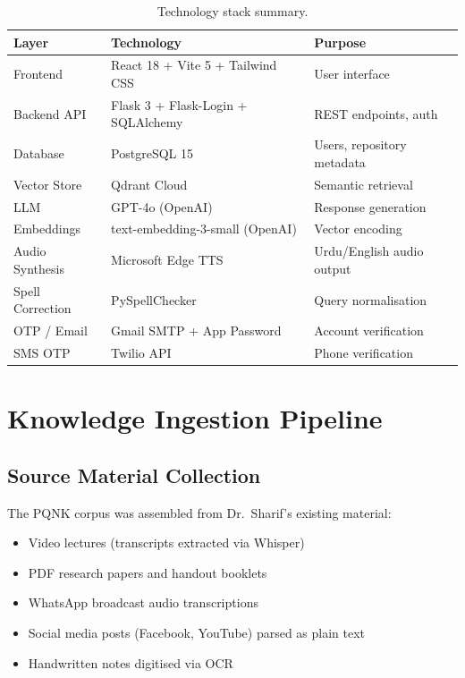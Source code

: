 \documentclass[12pt, a4paper]{article}
\begin{document}
\begin{onehalfspacing}
\begin{table}[H]
\centering
\caption{Technology stack summary.}
\begin{tabular}{@{}lll@{}}
\toprule
\textbf{Layer} & \textbf{Technology} & \textbf{Purpose} \\
\midrule
Frontend         & React 18 + Vite 5 + Tailwind CSS & User interface \\
Backend API      & Flask 3 + Flask-Login + SQLAlchemy & REST endpoints, auth \\
Database         & PostgreSQL 15                     & Users, repository metadata \\
Vector Store     & Qdrant Cloud                      & Semantic retrieval \\
LLM              & GPT-4o (OpenAI)                   & Response generation \\
Embeddings       & text-embedding-3-small (OpenAI)   & Vector encoding \\
Audio Synthesis  & Microsoft Edge TTS                & Urdu/English audio output \\
Spell Correction & PySpellChecker                    & Query normalisation \\
OTP / Email      & Gmail SMTP + App Password         & Account verification \\
SMS OTP          & Twilio API                        & Phone verification \\
\bottomrule
\end{tabular}
\end{table}


\section{Knowledge Ingestion Pipeline}

\subsection{Source Material Collection}

The PQNK corpus was assembled from Dr.~Sharif's existing material:
\begin{itemize}[noitemsep]
  \item Video lectures (transcripts extracted via Whisper)
  \item PDF research papers and handout booklets
  \item WhatsApp broadcast audio transcriptions
  \item Social media posts (Facebook, YouTube) parsed as plain text
  \item Handwritten notes digitised via OCR
\end{itemize}


\end{onehalfspacing}
\end{document}
